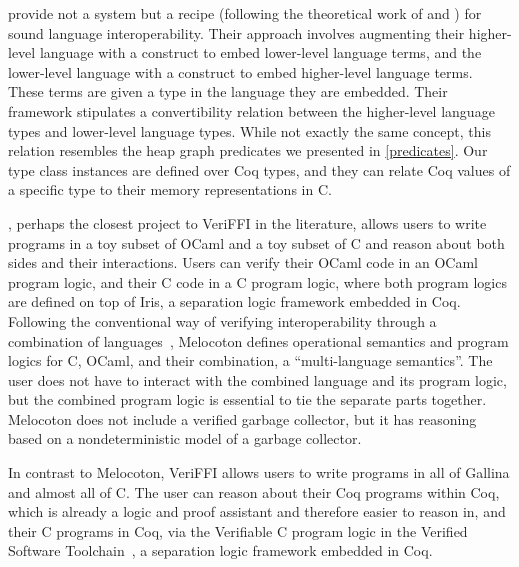  provide not a system but a recipe (following the theoretical work of  and ) for sound language interoperability. Their approach involves augmenting their higher-level language with a construct to embed lower-level language terms, and the lower-level language with a construct to embed higher-level language terms. These terms are given a type in the language they are embedded. Their framework stipulates a convertibility relation between the higher-level language types and lower-level language types. While not exactly the same concept, this relation resembles the heap graph predicates we presented in \autoref{predicates}. Our \GraphPredicate{} type class instances are defined over Coq types, and they can relate Coq values of a specific type to their memory representations in C. 

, perhaps the closest project to VeriFFI in the \FFI{} literature, allows users to write programs in a toy subset of OCaml and a toy subset of C and reason about both sides and their interactions. Users can verify their OCaml code in an OCaml program logic, and their C code in a C program logic, where both program logics are defined on top of Iris, a separation logic framework embedded in Coq.
Following the conventional way of verifying interoperability through a combination of languages~\cite{matthews2007operational, perconti2014verifying}, Melocoton defines operational semantics and program logics for C, OCaml, and their combination, a ``multi-language semantics''. The user does not have to interact with the combined language and its program logic, but the combined program logic is essential to tie the separate parts together. Melocoton does not include a verified garbage collector, but it has reasoning based on a nondeterministic model of a garbage collector.

In contrast to Melocoton, VeriFFI allows users to write programs in all of \gls{Gallina} and almost all of C. The user can reason about their Coq programs within Coq, which is already a logic and proof assistant and therefore easier to reason in, and their C programs in Coq, via the Verifiable C program logic in the Verified Software Toolchain~\cite{vst-floyd}, a separation logic framework embedded in Coq. 

